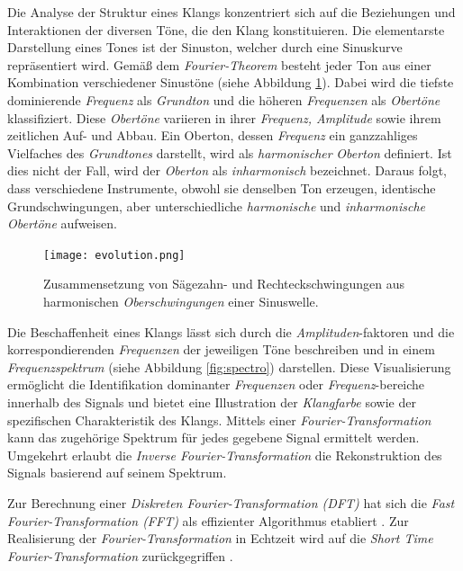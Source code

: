 \documentclass[
  a4paper,  %
  twoside,  %
  bibliography=totoc,
  headsepline,
  cleardoublepage=empty,
  parskip=half,
  draft=false
]{scrbook}
\begin{document}
Die Analyse der Struktur eines Klangs konzentriert sich auf die Beziehungen und Interaktionen der diversen Töne, die den Klang konstituieren. Die elementarste Darstellung eines Tones ist der Sinuston, welcher durch eine Sinuskurve repräsentiert wird. Gemäß dem \emph{Fourier-Theorem} besteht jeder Ton aus einer Kombination verschiedener Sinustöne (siehe Abbildung \ref{fig:evolution}). Dabei wird die tiefste dominierende \emph{Frequenz} als \emph{Grundton} und die höheren \emph{Frequenzen} als \emph{Obertöne} klassifiziert. Diese \emph{Obertöne} variieren in ihrer \emph{Frequenz, Amplitude} sowie ihrem zeitlichen Auf- und Abbau. Ein Oberton, dessen \emph{Frequenz} ein ganzzahliges Vielfaches des \emph{Grundtones} darstellt, wird als \emph{harmonischer} \emph{Oberton} definiert. Ist dies nicht der Fall, wird der \emph{Oberton} als \emph{inharmonisch} bezeichnet. Daraus folgt, dass verschiedene Instrumente, obwohl sie denselben Ton erzeugen, identische Grundschwingungen, aber unterschiedliche \emph{harmonische} und \emph{inharmonische} \emph{Obertöne} aufweisen. \cite{parker_good_2009, white_physics_2014, ruschkowski_elektronische_2019}

\begin{figure}
  \centering
  \texttt{[image: evolution.png]}
  \caption[Fourier Reihe]{Zusammensetzung von Sägezahn- und Rechteckschwingungen aus harmonischen \emph{Oberschwingungen} einer Sinuswelle.}
  \label{fig:evolution}
\end{figure}

Die Beschaffenheit eines Klangs lässt sich durch die \emph{Amplituden}-faktoren und die korrespondierenden \emph{Frequenzen} der jeweiligen Töne beschreiben und in einem \emph{Frequenzspektrum} (siehe Abbildung \ref{fig:spectro}) darstellen. Diese Visualisierung ermöglicht die Identifikation dominanter \emph{Frequenzen} oder \emph{Frequenz}-bereiche innerhalb des Signals und bietet eine Illustration der \emph{Klangfarbe} sowie der spezifischen Charakteristik des Klangs. Mittels einer \emph{Fourier-Transformation} kann das zugehörige Spektrum für jedes gegebene Signal ermittelt werden. Umgekehrt erlaubt die \emph{Inverse Fourier-Transformation} die Rekonstruktion des Signals basierend auf seinem Spektrum. \cite{raffaseder_audiodesign_2010}

Zur Berechnung einer \emph{Diskreten Fourier-Transformation (DFT)} hat sich die \emph{Fast Fourier-Transformation (FFT)} als effizienter Algorithmus etabliert \cite{heideman_gauss_1985}. Zur Realisierung der \emph{Fourier-Transformation} in Echtzeit wird auf die \emph{Short Time Fourier-Transformation} zurückgegriffen \cite{thyagarajan_introduction_2019}. 
\end{document}
